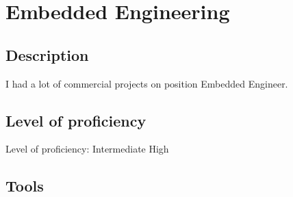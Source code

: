 \section{Embedded Engineering}

\subsection{Description}

I had a lot of commercial projects on position Embedded Engineer.

\subsection{Level of proficiency}

Level of proficiency: Intermediate High

\subsection{Tools}

